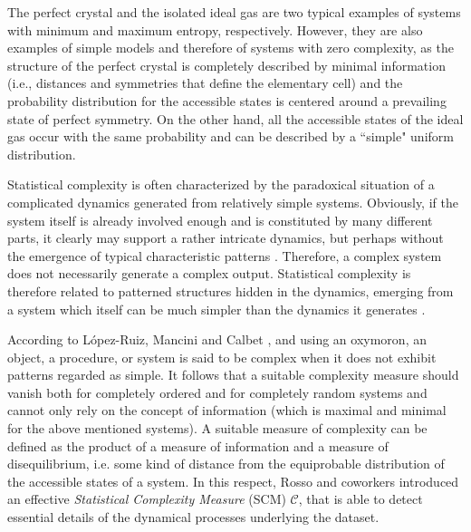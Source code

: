 The perfect crystal and the isolated ideal gas are two typical examples of systems with minimum and 
maximum entropy, respectively. 
However, they are also examples of simple models and therefore of systems with zero complexity, as the
structure of the perfect crystal is completely described by minimal information (i.e., distances and 
symmetries that define the elementary cell) and the probability distribution for the accessible states 
is centered around a prevailing state of perfect symmetry. 
On the other hand, all the accessible states of the ideal gas occur with the same probability and can be
described by a ``simple" uniform distribution. 

Statistical complexity is often characterized by the paradoxical situation of a complicated dynamics 
generated from relatively simple systems. 
Obviously, if the system itself is already involved enough and is constituted by many different parts, 
it clearly may support a rather intricate dynamics, but perhaps without the emergence of typical 
characteristic patterns \cite{Kantz1998}. 
Therefore, a complex system does not necessarily generate a complex output. 
Statistical complexity is therefore related to patterned structures hidden in the dynamics,
emerging from a system which itself can be much simpler than the dynamics it generates \cite{Kantz1998}.

According to L\'opez-Ruiz, Mancini and Calbet \cite{LMC1995}, and using an oxymoron, an object, a procedure, 
or system is said to be complex when it does not exhibit patterns regarded as simple. 
It follows that a suitable complexity measure should vanish both for completely ordered and for completely 
random systems and cannot only rely on the concept of information (which is maximal and minimal for the 
above mentioned systems).
A suitable measure of complexity can be defined as the product of a measure of information and a measure of
disequilibrium, i.e. some kind of distance from the equiprobable distribution of the accessible states of 
a system. 
In this respect, Rosso and coworkers \cite{Lamberti2004} introduced an effective {\it Statistical Complexity 
	Measure\/} (SCM) ${\mathcal C}$, that is able to detect essential details of the dynamical processes 
underlying the dataset.

